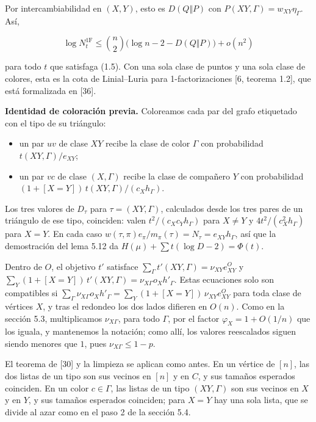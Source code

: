 \documentclass[spanish,11pt,a4paper]{article}
\providecommand{\tightlist}{\setlength{\itemsep}{0pt}\setlength{\parskip}{0pt}}
\begin{document}
Por intercambiabilidad en \((X,Y)\), esto es \(D(Q\Vert P)\) con \(P(XY,\Gamma)=w_{XY}\eta_\Gamma\). Así,

\nopagebreak[4]
\[\log N^{\mathrm{1F}}_t\le\binom{n}{2}\bigl(\log n-2-D(Q\Vert P)\bigr)+o(n^2)
\tag{5.3}\]

para todo \(t\) que satisfaga (1.5). Con una sola clase de puntos y una sola clase de colores, esta es la cota de Linial--Luria para 1-factorizaciones {[}6, teorema 1.2{]}, que está formalizada en {[}36{]}.

\textbf{Identidad de coloración previa.} Coloreamos cada par del grafo etiquetado con el tipo de su triángulo:

\begin{itemize}
\tightlist
\item
  un par \(uv\) de clase \(XY\) recibe la clase de color \(\Gamma\) con probabilidad \(t(XY,\Gamma)/e_{XY}\);
\item
  un par \(vc\) de clase \((X,\Gamma)\) recibe la clase de compañero \(Y\) con probabilidad \((1+[X=Y])\,t(XY,\Gamma)/(c_Xh_\Gamma)\).
\end{itemize}

Los tres valores de \(D_\tau\) para \(\tau=(XY,\Gamma)\), calculados desde los tres pares de un triángulo de ese tipo, coinciden: valen \(t^2/(c_Xc_Yh_\Gamma)\) para \(X\ne Y\) y \(4t^2/(c_X^2h_\Gamma)\) para \(X=Y\). En cada caso \(w(\tau,\pi)e_\pi/m_\pi(\tau)=N_\tau=e_{XY}h_\Gamma\), así que la demostración del lema 5.12 da \(H(\mu)+\sum t(\log D-2)=\Phi(t)\).

Dentro de \(O\), el objetivo \(t'\) satisface \(\sum_\Gamma t'(XY,\Gamma)=\nu_{XY}e^O_{XY}\) y \(\sum_Y(1+[X=Y])\,t'(XY,\Gamma)=\nu_{X\Gamma}o_Xh'_\Gamma\). Estas ecuaciones solo son compatibles si \(\sum_\Gamma\nu_{X\Gamma}o_Xh'_\Gamma=\sum_Y(1+[X=Y])\,\nu_{XY}e^O_{XY}\) para toda clase de vértices \(X\), y tras el redondeo los dos lados difieren en \(O(n)\). Como en la sección 5.3, multiplicamos \(\nu_{X\Gamma}\), para todo \(\Gamma\), por el factor \(\varphi_X=1+O(1/n)\) que los iguala, y mantenemos la notación; como allí, los valores reescalados siguen siendo menores que \(1\), pues \(\nu_{X\Gamma}\le1-p\).

El teorema de {[}30{]} y la limpieza se aplican como antes. En un vértice de \([n]\), las dos listas de un tipo son sus vecinos en \([n]\) y en \(C\), y sus tamaños esperados coinciden. En un color \(c\in\Gamma\), las listas de un tipo \((XY,\Gamma)\) son sus vecinos en \(X\) y en \(Y\), y sus tamaños esperados coinciden; para \(X=Y\) hay una sola lista, que se divide al azar como en el paso 2 de la sección 5.4.
\end{document}
